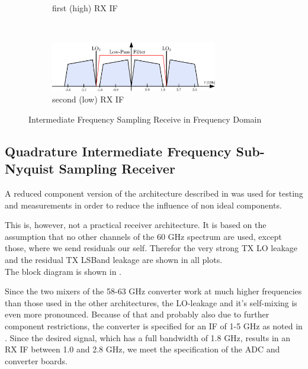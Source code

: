 \begin{figure}[p]
\begin{subfigure}{\textwidth}
    \caption{first (high) \gls{RX} \gls{IF}}
    \label{fig:rx_1_freq_rx_if1}
  \end{subfigure}
  \vspace{4ex} \\
  \begin{subfigure}{\textwidth}
    \centering
    \includegraphics[width=0.8\textwidth]{figures/rx_1_freq_rx_if2}
    \caption{second (low) \gls{RX} \gls{IF}}
    \label{fig:rx_1_freq_rx_if2}
  \end{subfigure}
  \caption{Intermediate Frequency Sampling Receive in Frequency Domain}
  \label{fig:rx_1_freq}
\end{figure}

\subsection{Quadrature Intermediate Frequency Sub-Nyquist Sampling Receiver}
\label{sec:rx_2}
A reduced component version of the architecture described in 
was used for testing and measurements in order to reduce the influence
of non ideal components.

This is, however, not a practical receiver architecture. 
It is based on the assumption that no other channels of the
60 GHz spectrum are used, except those, where we send residuals our self.
Therefor the very strong \gls{TX} \gls{LO} leakage and
the residual \gls{TX} \gls{LSBand} leakage are shown in all plots. \\

The block diagram is shown in .

Since the two mixers of the 58-63 GHz converter work at much
higher frequencies than those used in the other architectures, the
\gls{LO}-leakage and it's self-mixing is even more pronounced.
Because of that and probably also due to further component restrictions,
the converter is specified for an \gls{IF} of 1-5 GHz as noted in
.
Since the desired signal, which has a full bandwidth of 1.8 GHz,
results in an \gls{RX} \gls{IF} between 1.0 and 2.8 GHz,
we meet the specification of the \gls{ADC} and converter boards. \\

